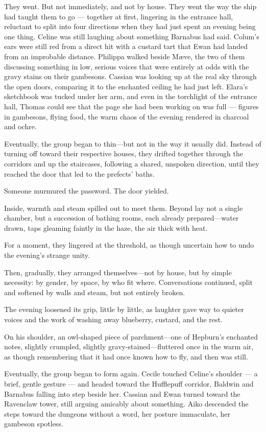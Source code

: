 They went. But not immediately, and not by house. They went the way the ship had taught them to go --- together at first, lingering in the entrance hall, reluctant to split into four directions when they had just spent an evening being one thing. Celine was still laughing about something Barnabus had said. Colum's ears were still red from a direct hit with a custard tart that Ewan had landed from an improbable distance. Philippa walked beside Mæve, the two of them discussing something in low, serious voices that were entirely at odds with the gravy stains on their gambesons. Cassian was looking up at the real sky through the open doors, comparing it to the enchanted ceiling he had just left. Elara's sketchbook was tucked under her arm, and even in the torchlight of the entrance hall, Thomas could see that the page she had been working on was full --- figures in gambesons, flying food, the warm chaos of the evening rendered in charcoal and ochre.
 
 Eventually, the group began to thin—but not in the way it usually did. Instead of turning off toward their respective houses, they drifted together through the corridors and up the staircases, following a shared, unspoken direction, until they reached the door that led to the prefects’ baths.

Someone murmured the password. The door yielded.

Inside, warmth and steam spilled out to meet them. Beyond lay not a single chamber, but a succession of bathing rooms, each already prepared—water drawn, taps gleaming faintly in the haze, the air thick with heat.

For a moment, they lingered at the threshold, as though uncertain how to undo the evening’s strange unity.

Then, gradually, they arranged themselves—not by house, but by simple necessity: by gender, by space, by who fit where. Conversations continued, split and softened by walls and steam, but not entirely broken.

The evening loosened its grip, little by little, as laughter gave way to quieter voices and the work of washing away blueberry, custard, and the rest.

On his shoulder, an owl-shaped piece of parchment—one of Hepburn’s enchanted notes, slightly crumpled, slightly gravy-stained—fluttered once in the warm air, as though remembering that it had once known how to fly, and then was still.
 
Eventually, the group began to form again. Cecile touched Celine's shoulder --- a brief, gentle gesture --- and headed toward the Hufflepuff corridor, Baldwin and Barnabus falling into step beside her. Cassian and Ewan turned toward the Ravenclaw tower, still arguing amicably about something. Aiko descended the steps toward the dungeons without a word, her posture immaculate, her gambeson spotless.
 
